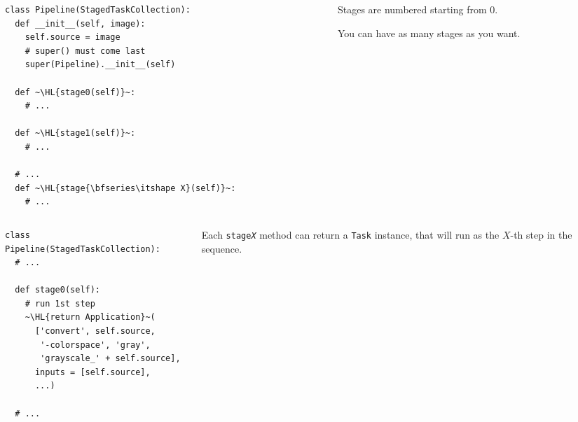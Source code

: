 \documentclass[english,serif,mathserif,xcolor=pdftex,dvipsnames,table]{beamer}
\begin{document}
\begin{frame}[fragile]
  \begin{columns}[c]
    \begin{column}{0.6\textwidth}
      \begin{lstlisting}[basicstyle=\footnotesize\ttfamily]
class Pipeline(StagedTaskCollection):
  def __init__(self, image):
    self.source = image
    # super() must come last
    super(Pipeline).__init__(self)

  def ~\HL{stage0(self)}~:
    # ...

  def ~\HL{stage1(self)}~:
    # ...

  # ...
  def ~\HL{stage{\bfseries\itshape X}(self)}~:
    # ...
      \end{lstlisting}
    \end{column}
    \begin{column}{0.4\textwidth}
      \raggedleft

      Stages are numbered starting from $0$.

      \+
      You can have as many stages as you want.
    \end{column}
  \end{columns}
\end{frame}


\begin{frame}[fragile]
  \begin{columns}[c]
    \begin{column}{0.6\textwidth}
      \begin{lstlisting}[basicstyle=\footnotesize\ttfamily]
class Pipeline(StagedTaskCollection):
  # ...

  def stage0(self):
    # run 1st step
    ~\HL{return Application}~(
      ['convert', self.source,
       '-colorspace', 'gray',
       'grayscale_' + self.source],
      inputs = [self.source],
      ...)

  # ...
      \end{lstlisting}
    \end{column}
    \begin{column}{0.4\textwidth}
      \raggedleft

      Each \texttt{stage{\itshape X}} method can return a \texttt{Task}
      instance, that will run as the $X$-th step in the sequence.
    \end{column}
  \end{columns}
\end{frame}
\end{document}
